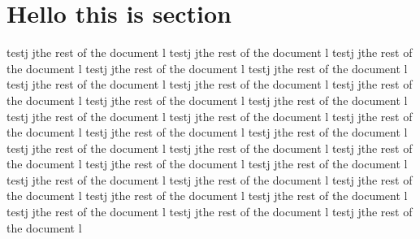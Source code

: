 \documentclass{article}
\begin{document}
\section{Hello this is section }
testj jthe rest of the document l
testj jthe rest of the document l
testj jthe rest of the document l
testj jthe rest of the document l
testj jthe rest of the document l
testj jthe rest of the document l
testj jthe rest of the document l
testj jthe rest of the document l
testj jthe rest of the document l
testj jthe rest of the document l
testj jthe rest of the document l
testj jthe rest of the document l
testj jthe rest of the document l
testj jthe rest of the document l
testj jthe rest of the document l
testj jthe rest of the document l
testj jthe rest of the document l
testj jthe rest of the document l
testj jthe rest of the document l
testj jthe rest of the document l
testj jthe rest of the document l
testj jthe rest of the document l
testj jthe rest of the document l
testj jthe rest of the document l
testj jthe rest of the document l
testj jthe rest of the document l
testj jthe rest of the document l
testj jthe rest of the document l
\end{document}
